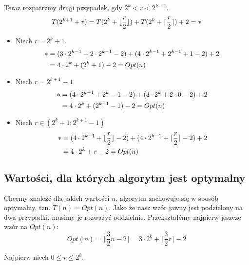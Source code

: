 \documentclass[a4paper,11pt]{article}
\begin{document}
Teraz rozpatrzmy drugi przypadek, gdy $2^k < r < 2^{k+1}$.
\begin{equation}
 T(2^{k+1} + r) = T(2^k + \lfloor \frac{r}{2} \rfloor ) + T(2^k + \lceil \frac{r}{2} \rceil ) + 2 = \text{\textasteriskcentered}
\end{equation}

\begin{itemize}
 \item Niech $r = 2^k + 1$.
 \begin{align}
   \text{\textasteriskcentered}
   &= (3 \cdot 2^{k-1} + 2 \cdot 2^{k-1} - 2) + (4 \cdot 2^{k-1} + 2^{k-1} + 1 - 2) + 2 \\
   &= 4 \cdot 2^k + (2^k + 1) - 2 = Opt(n)
 \end{align}
 
 \item Niech $r = 2^{k+1} - 1$
 \begin{align}
  \text{\textasteriskcentered}
   &= (4 \cdot 2^{k-1} + 2^k - 1 - 2) + (3 \cdot 2^k + 2 \cdot 0 - 2) + 2 \\
   &= 4 \cdot 2^k + (2^{k+1} - 1) - 2 = Opt(n)
 \end{align}
 
 \item Niech $r \in (2^k + 1; 2^{k+1} - 1)$
 \begin{align}
  \text{\textasteriskcentered}
   &= (4 \cdot 2^{k-1} + \lfloor \frac{r}{2} \rfloor - 2) + (4 \cdot 2^{k-1} + \lceil \frac{r}{2} \rceil - 2) + 2 \\
   &= 4 \cdot 2^k + r - 2 = Opt(n)
 \end{align}

\end{itemize}



\subsection{Wartości, dla których algorytm jest optymalny}
Chcemy znaleźć dla jakich wartości $n$, algorytm zachowuje się w sposób optymalny, tzn. $T(n) = Opt(n)$.
Jako że nasz wzór jawny jest podzielony na dwa przypadki, musimy je rozważyć oddzielnie.
Przekształćmy najpierw jeszcze wzór na $Opt(n)$:
\begin{equation}
 Opt(n) = \lceil \frac{3}{2} n - 2 \rceil =  3 \cdot 2^k + \lceil \frac{3}{2} r \rceil - 2
\end{equation}

Najpierw niech $0 \leq r \leq 2^k$.
\end{document}
